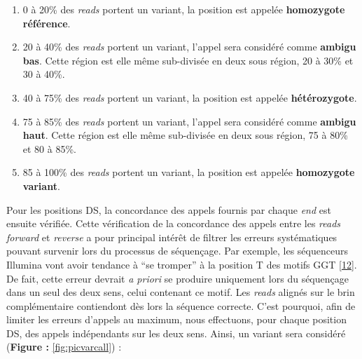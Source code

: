 \documentclass[12pt,twoside]{ugathesis}
\providecommand{\tightlist}{%
  \setlength{\itemsep}{0pt}\setlength{\parskip}{0pt}}
\begin{document}
\begin{enumerate}
\def\labelenumi{\arabic{enumi}.}
\tightlist
\item
  0 à 20\% des \emph{reads} portent un variant, la position est appelée
  \textbf{homozygote référence}.\\
\item
  20 à 40\% des \emph{reads} portent un variant, l'appel sera considéré
  comme \textbf{ambigu bas}. Cette région est elle même sub-divisée en
  deux sous région, 20 à 30\% et 30 à 40\%.\\
\item
  40 à 75\% des \emph{reads} portent un variant, la position est appelée
  \textbf{hétérozygote}.\\
\item
  75 à 85\% des \emph{reads} portent un variant, l'appel sera considéré
  comme \textbf{ambigu haut}. Cette région est elle même sub-divisée en
  deux sous région, 75 à 80\% et 80 à 85\%.\\
\item
  85 à 100\% des \emph{reads} portent un variant, la position est
  appelée \textbf{homozygote variant}.
\end{enumerate}

Pour les positions DS, la concordance des appels fournis par chaque
\emph{end} est ensuite vérifiée. Cette vérification de la concordance
des appels entre les \emph{reads forward} et \emph{reverse} a pour
principal intérêt de filtrer les erreurs systématiques pouvant survenir
lors du processus de séquençage. Par exemple, les séquenceurs Illumina
vont avoir tendance à ``se tromper'' à la position T des motifs GGT
{[}\protect\hyperlink{ref-Robinson2011}{12}{]}. De fait, cette erreur
devrait \emph{a priori} se produire uniquement lors du séquençage dans
un seul des deux sens, celui contenant ce motif. Les \emph{reads}
alignés sur le brin complémentaire contiendont dès lors la séquence
correcte. C'est pourquoi, afin de limiter les erreurs d'appels au
maximum, nous effectuons, pour chaque position DS, des appels
indépendants sur les deux sens. Ainsi, un variant sera considéré
(\textbf{Figure : }\ref{fig:picvarcall}) :
\end{document}
